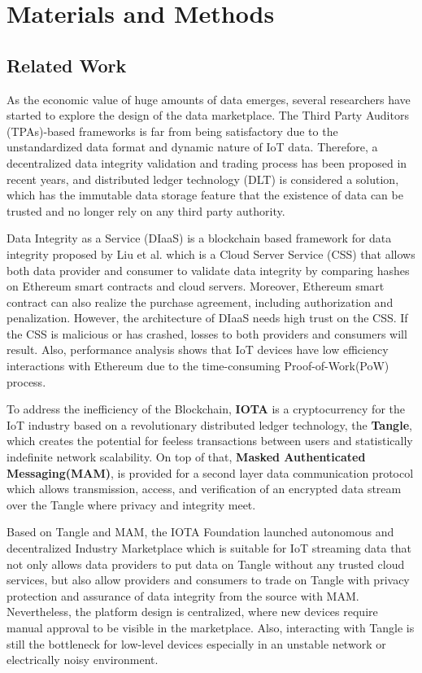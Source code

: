 \documentclass[journal,article,applsci,submit,moreauthors,pdftex]{Definitions/mdpi}
\begin{document}
\section{Materials and Methods}
\subsection{Related Work}
As the economic value of huge amounts of data emerges, several researchers have started to explore the design of the data marketplace. The Third Party Auditors (TPAs)-based frameworks\cite{TPA} is far from being satisfactory due to the unstandardized data format and dynamic nature of IoT data. Therefore, a decentralized data integrity validation and trading process has been proposed in recent years, and distributed ledger technology (DLT) is considered a solution, which has the immutable data storage feature that the existence of data can be trusted and no longer rely on any third party authority.

Data Integrity as a Service (DIaaS) is a blockchain based framework for data integrity proposed by Liu et al.\cite{DIaas} which is a Cloud Server Service (CSS) that allows both data provider and consumer to validate data integrity by comparing hashes on Ethereum smart contracts\cite{smartContract} and cloud servers. Moreover, Ethereum smart contract can also realize the purchase agreement, including authorization and penalization. However, the architecture of DIaaS needs high trust on the CSS. If the CSS is malicious or has crashed, losses to both providers and consumers will result. Also, performance analysis shows that IoT devices have low efficiency interactions with Ethereum due to the time-consuming Proof-of-Work(PoW) process.

To address the inefficiency of the Blockchain, \textbf{IOTA}\cite{IOTAwhitepaper} is a cryptocurrency for the IoT industry based on a revolutionary distributed ledger technology, the \textbf{Tangle}, which creates the potential for feeless transactions between users and statistically indefinite network scalability. On top of that, \textbf{Masked Authenticated Messaging(MAM)}\cite{MAM}\cite{MAMSpec}\cite{MAMDescription}, is provided for a second layer data communication protocol which allows transmission, access, and verification of an encrypted data stream over the Tangle where privacy and integrity meet.

Based on Tangle and MAM, the IOTA Foundation launched autonomous and decentralized Industry Marketplace\cite{IOTAIdustryMarketplace} which is suitable for IoT streaming data that not only allows data providers to put data on Tangle without any trusted cloud services, but also allow providers and consumers to trade on Tangle with privacy protection and assurance of data integrity from the source with MAM. Nevertheless, the platform design is centralized, where new devices require manual approval to be visible in the marketplace. Also, interacting with Tangle is still the bottleneck for low-level devices especially in an unstable network or electrically noisy environment.
\end{document}
